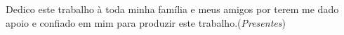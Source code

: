 
Dedico este trabalho à toda minha família e meus amigos por terem me dado apoio e confiado em mim para produzir este trabalho.(\textit{Presentes})